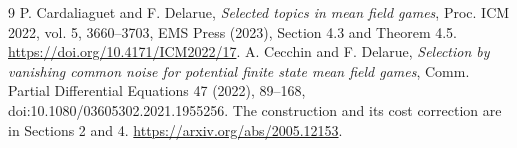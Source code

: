 \documentclass[11pt]{article}
\begin{document}
\begin{thebibliography}{9}
 P. Cardaliaguet and F. Delarue, \emph{Selected topics in mean field games}, Proc. ICM 2022, vol. 5, 3660--3703, EMS Press (2023), Section 4.3 and Theorem 4.5. \url{https://doi.org/10.4171/ICM2022/17}.
 A. Cecchin and F. Delarue, \emph{Selection by vanishing common noise for potential finite state mean field games}, Comm. Partial Differential Equations 47 (2022), 89--168, doi:10.1080/03605302.2021.1955256. The construction and its cost correction are in Sections 2 and 4. \url{https://arxiv.org/abs/2005.12153}.
\end{thebibliography}
\end{document}
